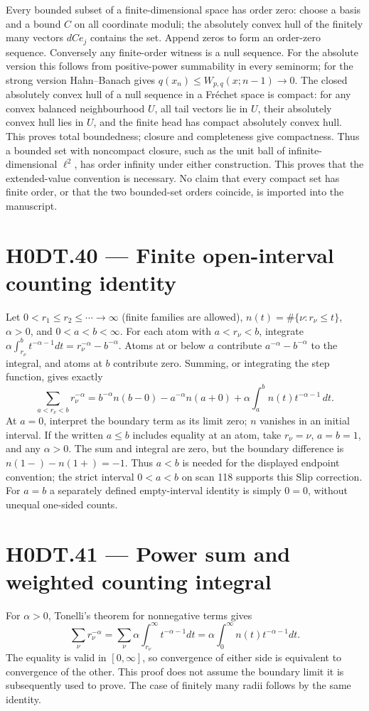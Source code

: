 Every bounded subset of a finite-dimensional space has order zero: choose a basis and a bound $C$ on all coordinate moduli; the absolutely convex hull of the finitely many vectors $dC e_j$ contains the set. Append zeros to form an order-zero sequence. Conversely any finite-order witness is a null sequence. For the absolute version this follows from positive-power summability in every seminorm; for the strong version Hahn--Banach gives $q(x_n)\le W_{p,q}(x;n-1)\to0$. The closed absolutely convex hull of a null sequence in a Fr\'echet space is compact: for any convex balanced neighbourhood $U$, all tail vectors lie in $U$, their absolutely convex hull lies in $U$, and the finite head has compact absolutely convex hull. This proves total boundedness; closure and completeness give compactness. Thus a bounded set with noncompact closure, such as the unit ball of infinite-dimensional $\ell^2$, has order infinity under either construction. This proves that the extended-value convention is necessary. No claim that every compact set has finite order, or that the two bounded-set orders coincide, is imported into the manuscript.

\section*{H0DT.40 --- Finite open-interval counting identity}
Let $0<r_1\le r_2\le\cdots\to\infty$ (finite families are allowed), $n(t)=\#\{\nu:r_\nu\le t\}$, $\alpha>0$, and $0<a<b<\infty$. For each atom with $a<r_\nu<b$, integrate $\alpha\int_{r_\nu}^b t^{-\alpha-1}dt=r_\nu^{-\alpha}-b^{-\alpha}$. Atoms at or below $a$ contribute $a^{-\alpha}-b^{-\alpha}$ to the integral, and atoms at $b$ contribute zero. Summing, or integrating the step function, gives exactly
\[
 \sum_{a<r_\nu<b}r_\nu^{-\alpha}
 =b^{-\alpha}n(b-0)-a^{-\alpha}n(a+0)
 +\alpha\int_a^b n(t)t^{-\alpha-1}\,dt.
\]
At $a=0$, interpret the boundary term as its limit zero; $n$ vanishes in an initial interval. If the written $a\le b$ includes equality at an atom, take $r_\nu=\nu$, $a=b=1$, and any $\alpha>0$. The sum and integral are zero, but the boundary difference is $n(1-)-n(1+)=-1$. Thus $a<b$ is needed for the displayed endpoint convention; the strict interval $0<a<b$ on scan 118 supports this Slip correction. For $a=b$ a separately defined empty-interval identity is simply $0=0$, without unequal one-sided counts.

\section*{H0DT.41 --- Power sum and weighted counting integral}
For $\alpha>0$, Tonelli's theorem for nonnegative terms gives
\[
 \sum_\nu r_\nu^{-\alpha}
 =\sum_\nu\alpha\int_{r_\nu}^{\infty}t^{-\alpha-1}dt
 =\alpha\int_0^\infty n(t)t^{-\alpha-1}dt.
\]
The equality is valid in $[0,\infty]$, so convergence of either side is equivalent to convergence of the other. This proof does not assume the boundary limit it is subsequently used to prove. The case of finitely many radii follows by the same identity.


